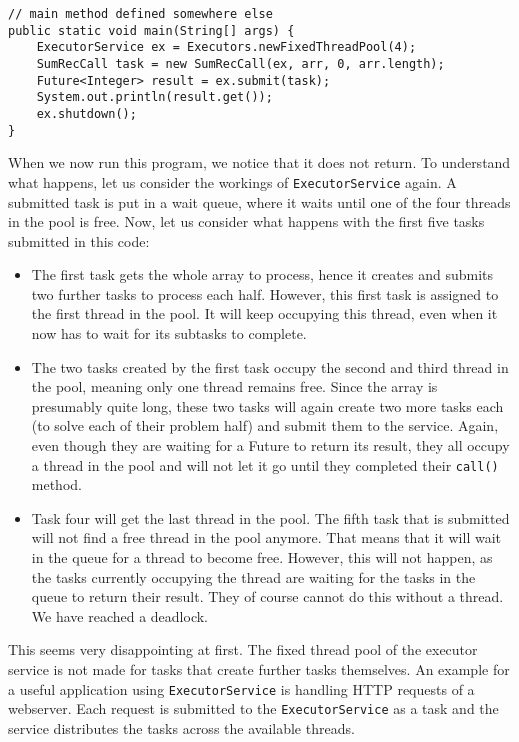 \documentclass[main.tex]{subfiles}
\begin{document}
\begin{verbatim}
// main method defined somewhere else
public static void main(String[] args) {
    ExecutorService ex = Executors.newFixedThreadPool(4);
    SumRecCall task = new SumRecCall(ex, arr, 0, arr.length);
    Future<Integer> result = ex.submit(task);
    System.out.println(result.get());
    ex.shutdown();
}
\end{verbatim}
\noindent When we now run this program, we notice that it does not return. To understand what happens, let us consider the workings of \texttt{ExecutorService} again. A submitted task is put in a wait queue, where it waits until one of the four threads in the pool is free. Now, let us consider what happens with the first five tasks submitted in this code:
\begin{itemize}
  \item The first task gets the whole array to process, hence it creates and submits two further tasks to process each half. However, this first task is assigned to the first thread in the pool. It will keep occupying this thread, even when it now has to wait for its subtasks to complete.
  \item The two tasks created by the first task occupy the second and third thread in the pool, meaning only one thread remains free. Since the array is presumably quite long, these two tasks will again create two more tasks each (to solve each of their problem half) and submit them to the service. Again, even though they are waiting for a Future to return its result, they all occupy a thread in the pool and will not let it go until they completed their \texttt{call()} method.
  \item Task four will get the last thread in the pool. The fifth task that is submitted will not find a free thread in the pool anymore. That means that it will wait in the queue for a thread to become free. However, this will not happen, as the tasks currently occupying the thread are waiting for the tasks in the queue to return their result. They of course cannot do this without a thread. We have reached a deadlock.
\end{itemize}
This seems very disappointing at first. The fixed thread pool of the executor service is not made for tasks that create further tasks themselves. An example for a useful application using \texttt{ExecutorService} is handling HTTP requests of a webserver. Each request is submitted to the \texttt{ExecutorService} as a task and the service distributes the tasks across the available threads.
\end{document}
